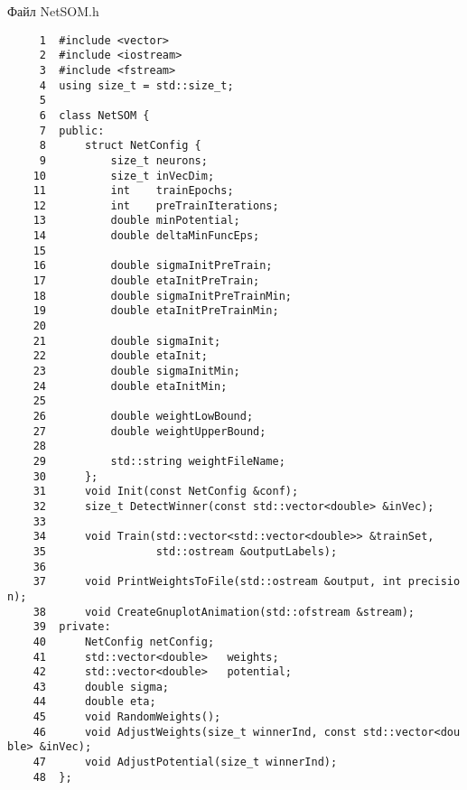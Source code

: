 Файл NetSOM.h

\begin{verbatim}
     1  #include <vector>
     2  #include <iostream>
     3  #include <fstream>
     4  using size_t = std::size_t;
     5
     6  class NetSOM {
     7  public:
     8      struct NetConfig {
     9          size_t neurons;
    10          size_t inVecDim;
    11          int    trainEpochs;
    12          int    preTrainIterations;
    13          double minPotential;
    14          double deltaMinFuncEps;
    15          
    16          double sigmaInitPreTrain;
    17          double etaInitPreTrain;
    18          double sigmaInitPreTrainMin;
    19          double etaInitPreTrainMin;
    20          
    21          double sigmaInit;
    22          double etaInit;
    23          double sigmaInitMin;
    24          double etaInitMin;
    25
    26          double weightLowBound;
    27          double weightUpperBound;
    28
    29          std::string weightFileName;
    30      };
    31      void Init(const NetConfig &conf);
    32      size_t DetectWinner(const std::vector<double> &inVec);
    33
    34      void Train(std::vector<std::vector<double>> &trainSet,
    35                 std::ostream &outputLabels);
    36
    37      void PrintWeightsToFile(std::ostream &output, int precisio
n);
    38      void CreateGnuplotAnimation(std::ofstream &stream);
    39  private:
    40      NetConfig netConfig;
    41      std::vector<double>   weights;
    42      std::vector<double>   potential;
    43      double sigma;
    44      double eta;
    45      void RandomWeights();
    46      void AdjustWeights(size_t winnerInd, const std::vector<dou
ble> &inVec);
    47      void AdjustPotential(size_t winnerInd);
    48  };
\end{verbatim}

